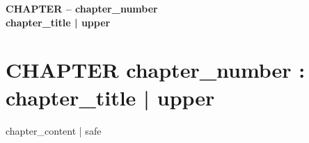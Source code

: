 \documentclass[12pt,a4paper]{article}
\begin{document}
\thispagestyle{empty}
\vspace*{\fill}
\begin{center}
\fontsize{24}{28}\selectfont\bfseries
CHAPTER -- {{ chapter_number }} \\
\vspace{1cm}
{{ chapter_title | upper }}
\end{center}
\vspace*{\fill}
\newpage

\thispagestyle{firstcontent}
\setcounter{page}{1}

\section*{CHAPTER {{ chapter_number }}: {{ chapter_title | upper }}}
\setcounter{figure}{0} %

\vspace{1cm}

\fontsize{12}{18}\selectfont{}
{{ chapter_content | safe }}


\end{document}
